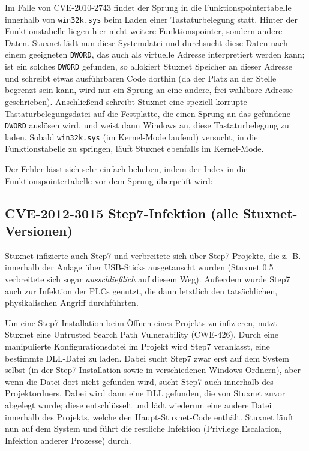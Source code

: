 \documentclass{article}
\begin{document}
Im Falle von CVE-2010-2743 findet der Sprung in die Funktionspointertabelle innerhalb von \texttt{win32k.sys} beim Laden einer Tastaturbelegung statt.
Hinter der Funktionstabelle liegen hier nicht weitere Funktionspointer, sondern andere Daten.
Stuxnet lädt nun diese Systemdatei und durchsucht diese Daten nach einem geeigneten \texttt{DWORD}, das auch als virtuelle Adresse interpretiert werden kann;
ist ein solches \texttt{DWORD} gefunden, so allokiert Stuxnet Speicher an dieser Adresse und schreibt etwas ausführbaren Code dorthin
(da der Platz an der Stelle begrenzt sein kann, wird nur ein Sprung an eine andere, frei wählbare Adresse geschrieben).
Anschließend schreibt Stuxnet eine speziell korrupte Tastaturbelegungsdatei auf die Festplatte, die einen Sprung an das gefundene \texttt{DWORD} auslösen wird,
und weist dann Windows an, diese Tastaturbelegung zu laden.
Sobald \texttt{win32k.sys} (im Kernel-Mode laufend) versucht, in die Funktionstabelle zu springen,
läuft Stuxnet ebenfalls im Kernel-Mode.

Der Fehler lässt sich sehr einfach beheben, indem der Index in die Funktionspointertabelle vor dem Sprung überprüft wird:



\subsection{CVE-2012-3015 Step7-Infektion (alle Stuxnet-Versionen)}

Stuxnet infizierte auch Step7 und verbreitete sich über Step7-Projekte,
die z.~B. innerhalb der Anlage über USB-Sticks ausgetauscht wurden
(Stuxnet 0.5 verbreitete sich sogar \emph{ausschließlich} auf diesem Weg).
Außerdem wurde Step7 auch zur Infektion der PLCs genutzt, die dann letztlich den tatsächlichen, physikalischen Angriff durchführten.

Um eine Step7-Installation beim Öffnen eines Projekts zu infizieren, nutzt Stuxnet eine Untrusted Search Path Vulnerability (CWE-426\cite{cwe_searchpath}).
Durch eine manipulierte Konfigurationsdatei im Projekt wird Step7 veranlasst, eine bestimmte DLL-Datei zu laden.
Dabei sucht Step7 zwar erst auf dem System selbst (in der Step7-Installation sowie in verschiedenen Windows-Ordnern), %
aber wenn die Datei dort nicht gefunden wird, sucht Step7 auch innerhalb des Projektordners.
Dabei wird dann eine DLL gefunden, die von Stuxnet zuvor abgelegt wurde;
diese entschlüsselt und lädt wiederum eine andere Datei innerhalb des Projekts, welche den Haupt-Stuxnet-Code enthält.
Stuxnet läuft nun auf dem System und führt die restliche Infektion (Privilege Escalation, Infektion anderer Prozesse) durch.
\end{document}
